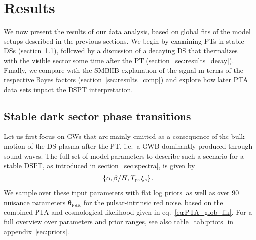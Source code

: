 \section{Results}
\label{sec:results}

We now present the results of our data analysis, based on global fits of the model setups described in the previous sections. We begin by examining \acp{PT} in stable \acp{DS} (section~\ref{sec:results_stable}), followed by a discussion of a decaying \ac{DS} that thermalizes with the visible sector some time after the \ac{PT} (section~\ref{sec:results_decay}). Finally, we compare with the \ac{SMBHB} explanation of the signal in terms of the respective Bayes factors (section~\ref{sec:results_comp}) and explore how later \ac{PTA} data sets impact the \ac{DSPT} interpretation.

\subsection{Stable dark sector phase transitions}
\label{sec:results_stable}

Let us first focus on \acp{GW} that are mainly emitted as a consequence of the bulk motion of the \ac{DS} plasma after the \ac{PT}, i.e.~a \ac{GWB} dominantly  produced through sound waves. The full set of model parameters  to describe such a scenario for a stable \ac{DSPT}, as introduced in section~\ref{sec:spectra}, is given by
\begin{align}
	\{\alpha, \beta/H, T_{\text{p}}, \xi_{\text{p}}\}\,.
\end{align}
We sample over these input parameters with flat log priors, as well as over 90 nuisance parameters $\bm{\theta}_\text{PSR}$ for the pulsar-intrinsic red noise, based on the combined \ac{PTA} and cosmological likelihood given in eq.~\eqref{eq:PTA_glob_lik}. For a full overview over parameters and prior ranges, see also table~\ref{tab:priors} in appendix~\ref{sec:priors}. 

